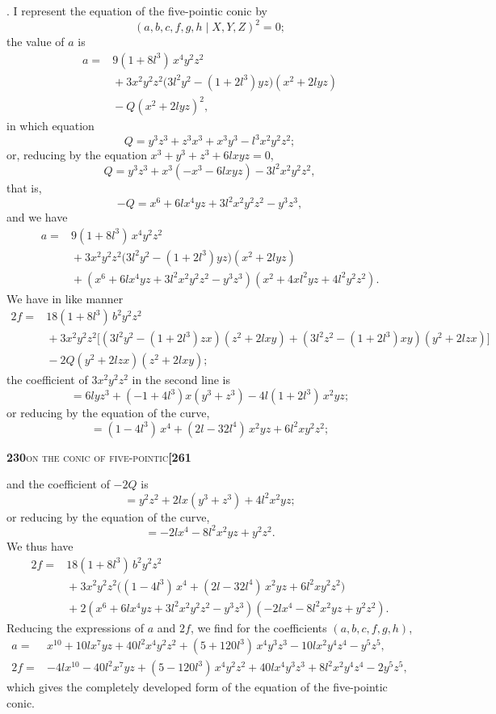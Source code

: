\documentclass[11pt]{article}
\newcommand{\Cdel}{\mid}
\begin{document}
. I represent the equation of the five-pointic conic by
\[
  (a, b, c, f, g, h \Cdel X, Y, Z)^2 = 0;
\]
the value of $a$ is
\[
\begin{aligned}
  a ={}& 9(1 + 8l^3)\,x^4 y^2 z^2\\
       &{} + 3x^2 y^2 z^2\bigl(3l^2 y^2 - (1 + 2l^3) yz\bigr)(x^2 + 2lyz)\\
       &{} - Q(x^2 + 2lyz)^2,
\end{aligned}
\]
in which equation
\[
  Q = y^3 z^3 + z^3 x^3 + x^3 y^3 - l^3 x^2 y^2 z^2;
\]
or, reducing by the equation $x^3 + y^3 + z^3 + 6lxyz = 0$,
\[
  Q = y^3 z^3 + x^3(-x^3 - 6lxyz) - 3l^2 x^2 y^2 z^2,
\]
that is,
\[
  -Q = x^6 + 6lx^4 yz + 3l^2 x^2 y^2 z^2 - y^3 z^3,
\]
and we have
\[
\begin{aligned}
  a ={}& 9(1 + 8l^3)\,x^4 y^2 z^2\\
       &{} + 3x^2 y^2 z^2\bigl(3l^2 y^2 - (1 + 2l^3) yz\bigr)(x^2 + 2lyz)\\
       &{} + (x^6 + 6lx^4 yz + 3l^2 x^2 y^2 z^2 - y^3 z^3)(x^2 + 4xl^2 yz + 4l^2 y^2 z^2).
\end{aligned}
\]
We have in like manner
\[
\begin{aligned}
  2f ={}& 18(1 + 8l^3)\,b^2 y^2 z^2\\
        &{} + 3x^2 y^2 z^2\bigl[(3l^2 y^2 - (1 + 2l^3) zx)(z^2 + 2lxy) + (3l^2 z^2 - (1 + 2l^3) xy)(y^2 + 2lzx)\bigr]\\
        &{} - 2Q(y^2 + 2lzx)(z^2 + 2lxy);
\end{aligned}
\]
the coefficient of $3x^2 y^2 z^2$ in the second line is
\[
  = 6l y z^3 + (-1 + 4l^3) x(y^3 + z^3) - 4l(1 + 2l^3)\,x^2 yz;
\]
or reducing by the equation of the curve,
\[
  = (1 - 4l^3)\,x^4 + (2l - 32l^4)\,x^2 yz + 6l^2 x y^2 z^2;
\]

\newpage
\noindent\textbf{230}\hfill\textsc{on the conic of five-pointic}\hfill\textbf{[261}

\medskip

\noindent and the coefficient of $-2Q$ is
\[
  = y^2 z^2 + 2lx(y^3 + z^3) + 4l^2 x^2 yz;
\]
or reducing by the equation of the curve,
\[
  = -2lx^4 - 8l^2 x^2 yz + y^2 z^2.
\]
We thus have
\[
\begin{aligned}
  2f ={}& 18(1 + 8l^3)\,b^2 y^2 z^2\\
        &{} + 3x^2 y^2 z^2\bigl((1 - 4l^3)\,x^4 + (2l - 32l^4)\,x^2 yz + 6l^2 x y^2 z^2\bigr)\\
        &{} + 2(x^6 + 6lx^4 yz + 3l^2 x^2 y^2 z^2 - y^3 z^3)(-2lx^4 - 8l^2 x^2 yz + y^2 z^2).
\end{aligned}
\]
Reducing the expressions of $a$ and $2f$, we find for the coefficients $(a, b, c, f, g, h)$,
\[
\begin{aligned}
  a  ={}& x^{10} + 10lx^7 yz + 40l^2 x^4 y^2 z^2 + (5 + 120l^3)\,x^4 y^3 z^3 - 10lx^2 y^4 z^4 - y^5 z^5,\\[4pt]
  2f ={}& -4lx^{10} - 40l^2 x^7 yz + (5 - 120l^3)\,x^4 y^2 z^2 + 40lx^4 y^3 z^3 + 8l^2 x^2 y^4 z^4 - 2y^5 z^5,
\end{aligned}
\]
which gives the completely developed form of the equation of the five-pointic conic.
\end{document}
